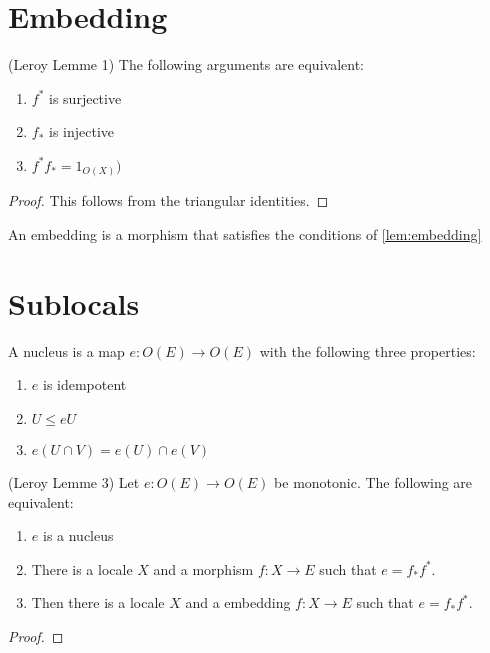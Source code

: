 \section{Embedding}
\begin{lemma}[Embedding]
(Leroy Lemme 1)
    \label{lem:embedding}
    \leanok
    The following arguments are equivalent:
    \begin{enumerate}
        \item $f^*$ is surjective
        \item $f_*$ is injective
        \item $f^{*}f_* = 1_{O(X)})$
    \end{enumerate}
\end{lemma}
\begin{proof}
    This follows from the triangular identities. \leanok
\end{proof}

\begin{definition}[Embedding]
    \label{def:embedding}
    An embedding is a morphism that satisfies the conditions of \cref{lem:embedding}
    \leanok
\end{definition}


\section{Sublocals}
\begin{definition}[Nucleus]
    \label{def:nucleus}
    \leanok
    A nucleus is a map $e : O(E) \rightarrow O(E)$ with the following three properties:
    \begin{enumerate}
        \item $e$ is idempotent
        \item $U \le e U$
        \item $e(U \cap V) = e(U) \cap e(V)$
    \end{enumerate}
\end{definition}

\begin{lemma}[Nucleus]
(Leroy Lemme 3)
    \label{lem:nucleus}
    \leanok
    Let $e : O(E) \rightarrow O(E)$ be monotonic. The following are equivalent:
    \begin{enumerate}
        \item $e$ is a nucleus
        \item There is a locale $X$ and a morphism $f: X \rightarrow E$ such that $e = f_*f^*$.
        \item Then there is a locale $X$ and a embedding $f: X \rightarrow E$ such that $e = f_*f^*$.
    \end{enumerate}
\end{lemma}
\begin{proof}
    \leanok
\end{proof}

